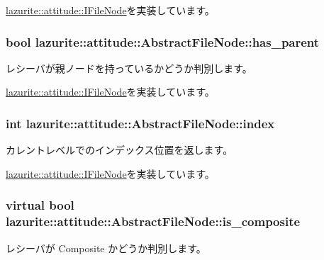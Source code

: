 \hyperlink{interfacelazurite_1_1attitude_1_1_i_file_node_a8904c51913b26cf0299ab565a1226b95}{lazurite::attitude::IFileNode}を実装しています。\hypertarget{classlazurite_1_1attitude_1_1_abstract_file_node_ae05845cbaf865f736f7ab086c2917c37}{
\subsubsection[{has\_\-parent}]{\setlength{\rightskip}{0pt plus 5cm}bool lazurite::attitude::AbstractFileNode::has\_\-parent}}
\label{classlazurite_1_1attitude_1_1_abstract_file_node_ae05845cbaf865f736f7ab086c2917c37}
レシーバが親ノードを持っているかどうか判別します。 

\hyperlink{interfacelazurite_1_1attitude_1_1_i_file_node_a564ece8cd8b85bc04bfe7fbe9d9ac0ba}{lazurite::attitude::IFileNode}を実装しています。\hypertarget{classlazurite_1_1attitude_1_1_abstract_file_node_aa577939aa3338fcc7ddb7a8b916bfce3}{
\subsubsection[{index}]{\setlength{\rightskip}{0pt plus 5cm}int lazurite::attitude::AbstractFileNode::index}}
\label{classlazurite_1_1attitude_1_1_abstract_file_node_aa577939aa3338fcc7ddb7a8b916bfce3}


カレントレベルでのインデックス位置を返します。 

\hyperlink{interfacelazurite_1_1attitude_1_1_i_file_node_a12c90a434a3bbbc7aa33998855d267d1}{lazurite::attitude::IFileNode}を実装しています。\hypertarget{classlazurite_1_1attitude_1_1_abstract_file_node_aa10f20180663fe19416447c3b3486061}{
\subsubsection[{is\_\-composite}]{\setlength{\rightskip}{0pt plus 5cm}virtual bool lazurite::attitude::AbstractFileNode::is\_\-composite}}
\label{classlazurite_1_1attitude_1_1_abstract_file_node_aa10f20180663fe19416447c3b3486061}
レシーバが Composite かどうか判別します。 

